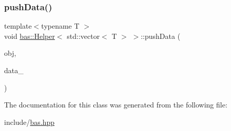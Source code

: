 \mbox{\label{classbas_1_1Helper_3_01std_1_1vector_3_01T_01_4_01_4_a7185b02d78d80dd7438cc86a6cbd05f0}} 
\subsubsection{\texorpdfstring{pushData()}{pushData()}}
{\footnotesize\ttfamily template$<$typename T $>$ \\
void \mbox{\hyperlink{classbas_1_1Helper}{bas\+::\+Helper}}$<$ std\+::vector$<$ T $>$ $>$\+::push\+Data (\begin{DoxyParamCaption}\item[{\mbox{\hyperlink{classbas_1_1SerializedObject}{Serialized\+Object}} \&}]{obj,  }\item[{const std\+::vector$<$ T $>$ \&}]{data\+\_\+ }\end{DoxyParamCaption})\hspace{0.3cm}{\ttfamily [inline]}}



The documentation for this class was generated from the following file\+:\begin{DoxyCompactItemize}
\item 
include/\mbox{\hyperlink{bas_8hpp}{bas.\+hpp}}\end{DoxyCompactItemize}
